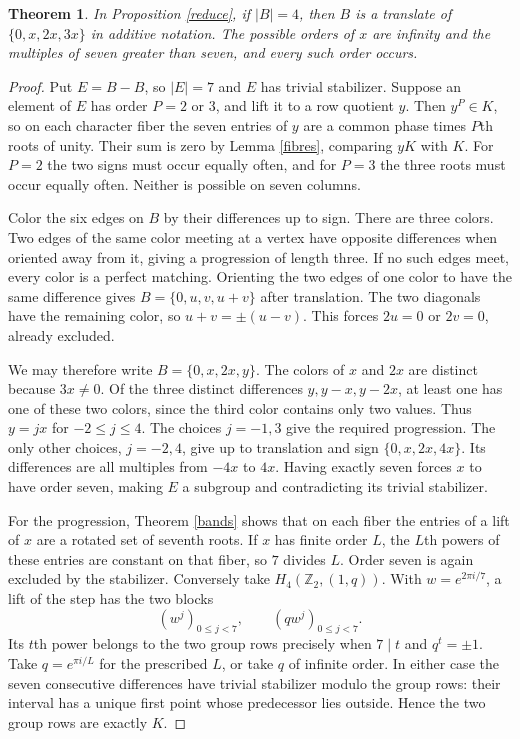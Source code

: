 \documentclass[11pt,a4paper]{article}
\newtheorem{thm}{Theorem}[section]
\begin{document}
\begin{thm}\label{fourcosets}
In Proposition \ref{reduce}, if $|B|=4$, then $B$ is a translate of $\{0,x,2x,3x\}$ in additive notation. The possible orders of $x$ are infinity and the multiples of seven greater than seven, and every such order occurs.
\end{thm}
\begin{proof}
Put $E=B-B$, so $|E|=7$ and $E$ has trivial stabilizer. Suppose an element of $E$ has order $P=2$ or $3$, and lift it to a row quotient $y$. Then $y^P\in K$, so on each character fiber the seven entries of $y$ are a common phase times $P$th roots of unity. Their sum is zero by Lemma \ref{fibres}, comparing $yK$ with $K$. For $P=2$ the two signs must occur equally often, and for $P=3$ the three roots must occur equally often. Neither is possible on seven columns.

Color the six edges on $B$ by their differences up to sign. There are three colors. Two edges of the same color meeting at a vertex have opposite differences when oriented away from it, giving a progression of length three. If no such edges meet, every color is a perfect matching. Orienting the two edges of one color to have the same difference gives $B=\{0,u,v,u+v\}$ after translation. The two diagonals have the remaining color, so $u+v=\pm(u-v)$. This forces $2u=0$ or $2v=0$, already excluded.

We may therefore write $B=\{0,x,2x,y\}$. The colors of $x$ and $2x$ are distinct because $3x\ne0$. Of the three distinct differences $y,y-x,y-2x$, at least one has one of these two colors, since the third color contains only two values. Thus $y=jx$ for $-2\leq j\leq4$. The choices $j=-1,3$ give the required progression. The only other choices, $j=-2,4$, give up to translation and sign $\{0,x,2x,4x\}$. Its differences are all multiples from $-4x$ to $4x$. Having exactly seven forces $x$ to have order seven, making $E$ a subgroup and contradicting its trivial stabilizer.

For the progression, Theorem \ref{bands} shows that on each fiber the entries of a lift of $x$ are a rotated set of seventh roots. If $x$ has finite order $L$, the $L$th powers of these entries are constant on that fiber, so $7$ divides $L$. Order seven is again excluded by the stabilizer. Conversely take $H_4(\mathbb Z_2,(1,q))$. With $w=e^{2\pi i/7}$, a lift of the step has the two blocks
\[
 (w^j)_{0\leq j<7},\qquad (qw^j)_{0\leq j<7}.
\]
Its $t$th power belongs to the two group rows precisely when $7\mid t$ and $q^t=\pm1$. Take $q=e^{\pi i/L}$ for the prescribed $L$, or take $q$ of infinite order. In either case the seven consecutive differences have trivial stabilizer modulo the group rows: their interval has a unique first point whose predecessor lies outside. Hence the two group rows are exactly $K$.
\end{proof}
\end{document}
